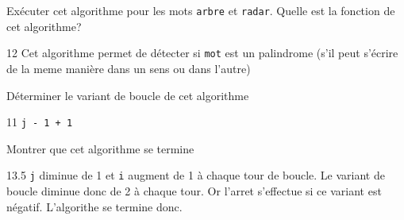 \documentclass[a4paper,10pt]{report}
\def\ptsexoB{4}
\def\ptsexoC{3}
\begin{document}
\exods{\ptsexoB}

    \begin{enumerate}
\begin{minipage}{0.48\linewidth}
   
\item Exécuter cet algorithme pour les mots \verb+arbre+ et \verb+radar+. Quelle est la fonction de cet algorithme?
    
    \begin{answer}{1}{2}  Cet algorithme permet de détecter si \verb|mot| est un palindrome (s'il peut s'écrire de la meme manière dans un sens ou dans l'autre)  \end{answer}
\item Déterminer le variant de boucle de cet algorithme
    
    
    \begin{answer}{1}{1}  \verb|j - 1 + 1|  \end{answer}
    
\end{minipage}\hfill
\begin{minipage}{0.48\linewidth}
    
    
    \item Montrer que cet algorithme se termine
    \begin{answer}{1}{3.5}  \verb|j| diminue de 1 et \verb|i| augment de 1 à chaque tour de boucle. Le variant de boucle diminue donc de 2 à chaque tour. Or l'arret s'effectue si ce variant est négatif. L'algorithe se termine donc.  \end{answer}
\end{minipage}

\end{enumerate}


  

\exods{\ptsexoC}
\end{document}

